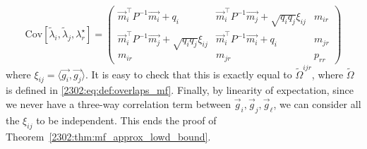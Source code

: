 \[ \mathrm{Cov}\left[\tilde \lambda_i, \tilde \lambda_j, \lambda^\star_r\right] = \begin{pmatrix}
    \vec{m}_i^\top P^{-1} \vec{m_i} + q_i & \vec{m}_i^\top P^{-1} \vec{m_j} + \sqrt{q_i q_j} \xi_{ij} & m_{ir} \\
    \vec{m}_i^\top P^{-1} \vec{m_j} + \sqrt{q_i q_j} \xi_{ij} & \vec{m}_i^\top P^{-1} \vec{m_i} + q_i &  m_{jr} \\
    m_{ir} & m_{jr} & p_{rr}
\end{pmatrix} \]
where $\xi_{ij} = \langle \vec{g_i}, \vec{g_j} \rangle$. It is easy to check that this is exactly equal to $\tilde\Omega^{ijr}$, where $\tilde\Omega$ is defined in \eqref{2302:eq:def:overlaps_mf}. Finally, by linearity of expectation, since we never have a three-way correlation term between $\vec{g}_i, \vec{g}_j, \vec{g}_\ell$, we can consider all the $\xi_{ij}$ to be independent. This ends the proof of Theorem~\ref{2302:thm:mf_approx_lowd_bound}.
